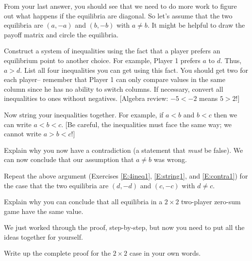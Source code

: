 From your last answer, you should see that we need to do more work to figure out what happens if the equilibria are diagonal. So let's assume that the two equilibria are $(a, -a)$ and $(b, -b)$ with $a \neq b$. It might be helpful to draw the payoff matrix and circle the equilibria.


\begin{xca}\label{E:4ineq1} 
Construct a system of inequalities using the fact that a player prefers an equilibrium point to another choice. For example, Player 1 prefers $a$ to $d$. Thus, $a > d$. List all four inequalities you can get using this fact. You should get two for each player-- remember that Player 1 can only compare values in the same column  since he has no ability to switch columns. If necessary, convert all inequalities to ones without negatives. [Algebra review: $-5 < -2$ means $5 > 2$!]
\end{xca}

\begin{xca}\label{E:string1}
Now string your inequalities together. For example, if $a < b$ and $b < c$ then we can write $a < b < c$. [Be careful, the inequalities must face the same way; we cannot write $a> b < c$!]
\end{xca}

\begin{xca}\label{E:contra1}
Explain why you now have a contradiction (a statement that \emph{must} be false). 
We can now conclude that our assumption that $a \neq b$ was wrong.
\end{xca}

\begin{xca}\label{E:repeatineq}
Repeat the above argument (Exercises \ref{E:4ineq1}, \ref{E:string1}, and \ref{E:contra1}) for the case that the two equilibria are $(d, -d)$ and $(c, -c)$ with $d\neq c$.
\end{xca}

\begin{xca}\label{E:concl2x2}
Explain why you can conclude that all equilibria in a $2 \times 2$ two-player zero-sum game have the same value.
\end{xca}

We just worked through the proof, step-by-step, but now you need to put all the ideas together for yourself.

\begin{xca}\label{E:2x2proof}
Write up the complete proof for the $2 \times 2$ case in your own words.
\end{xca}

